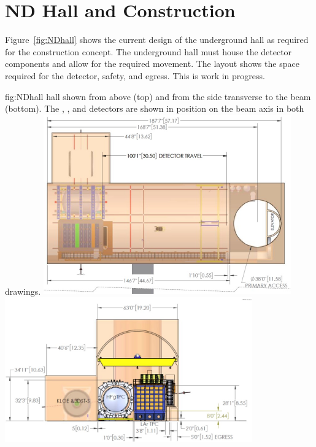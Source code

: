 
\chapter{ND Hall and Construction}
\label{sec:appx-nd:exsum-nd-hall}
%

Figure~\ref{fig:NDhall} shows the current design of the underground hall as required for the   construction concept. The underground hall must house the detector components and allow for the required movement. The layout shows the space required for the detector, safety, and egress.  This is work in progress. 

\begin{dunefigure}{fig:NDhall}
{   hall shown from above (top) and from the side transverse to the beam (bottom). The , , and  detectors are shown in position on the beam axis in both drawings. }
\includegraphics[width=0.8\textwidth]{graphics/Hall_top.jpg}
\includegraphics[width=0.8\textwidth]{graphics/Hall_side.jpg}
\end{dunefigure}

